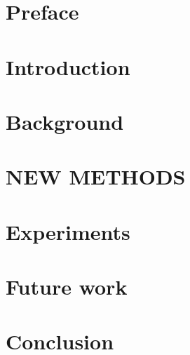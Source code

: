 \documentclass[12pt,twoside,onecolumn]{article}
\begin{document}
\section{Preface}
\newpage

\section{Introduction}
\newpage

\section{Background}

\newpage

\section{NEW METHODS}
\newpage

\section{Experiments}
\newpage

\section{Future work}
\newpage

\section{Conclusion}
\newpage



\end{document}
